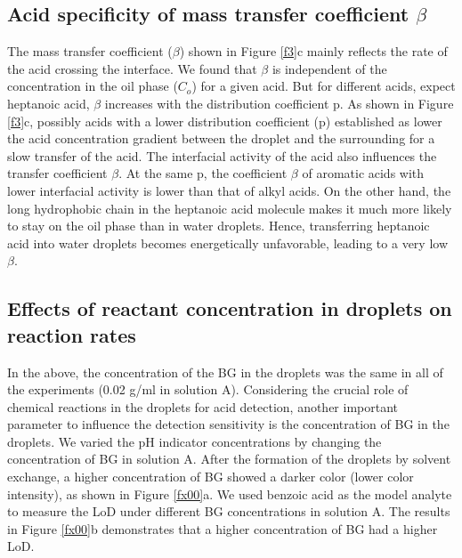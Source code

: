 \documentclass[journal=langd5,manuscript=article]{achemso}
\begin{document}
\subsection{Acid specificity of mass transfer coefficient $\beta$}
The mass transfer coefficient ($\beta$) shown in Figure \ref{f3}c mainly reflects the rate of the acid crossing the interface. We found that $\beta$ is independent of the concentration in the oil phase ($C_o$) for a given acid. But for different acids, expect heptanoic acid, $\beta$ increases with the distribution coefficient p. As shown in Figure \ref{f3}c, possibly acids with a lower distribution coefficient (p) established as lower the acid concentration gradient between the droplet and the surrounding for a slow transfer of the acid. The interfacial activity of the acid also influences the transfer coefficient $\beta$. At the same p, the coefficient $\beta$ of aromatic acids with lower interfacial activity is lower than that of alkyl acids. On the other hand, the long hydrophobic chain in the heptanoic acid molecule makes it much more likely to stay on the oil phase than in water droplets. Hence, transferring heptanoic acid into water droplets becomes energetically unfavorable, leading to a very low $\beta$.

\subsection{Effects of reactant concentration in droplets on reaction rates}

In the above, the concentration of the BG in the droplets was the same in all of the experiments (0.02 g/ml in solution A). Considering the crucial role of chemical reactions in the droplets for acid detection, another important parameter to influence the detection sensitivity is the concentration of BG in the droplets. We varied the pH indicator concentrations by changing the concentration of BG in solution A. After the formation of the droplets by solvent exchange, a higher concentration of BG showed a darker color (lower color intensity), as shown in Figure \ref{fx00}a. We used benzoic acid as the model analyte to measure the LoD under different BG concentrations in solution A. The results in Figure \ref{fx00}b demonstrates that a higher concentration of BG had a higher LoD.\\
\end{document}
